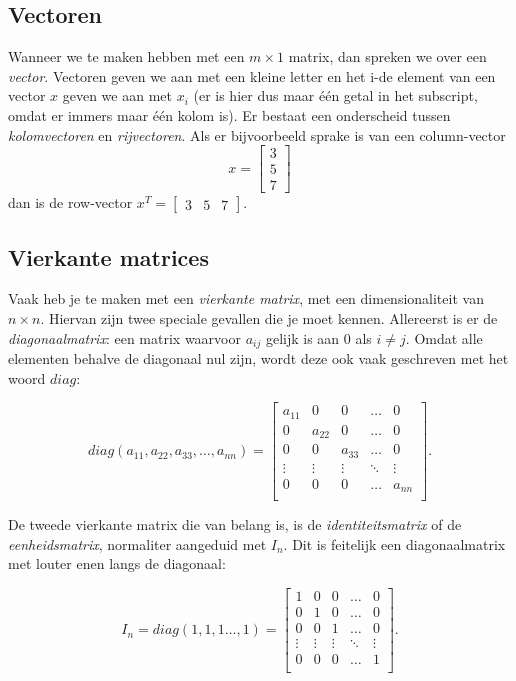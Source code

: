 \subsection{Vectoren}
Wanneer we te maken hebben met een $m \times 1$ matrix, dan spreken we over een \textit{vector}. Vectoren geven we aan met een kleine letter en het i-de element van een vector $x$ geven we aan met $x_i$ (er is hier dus maar één getal in het subscript, omdat er immers maar één kolom is). Er bestaat een onderscheid tussen \textit{kolomvectoren} en \textit{rijvectoren}. Als er bijvoorbeeld sprake is van een column-vector
%
\[ 
x = \begin{bmatrix} 
3\\
5\\
7
\end{bmatrix}
\] 
%
dan is de row-vector $x^T = \begin{bmatrix}3 & 5 & 7\end{bmatrix}$.

\subsection{Vierkante matrices}
Vaak heb je te maken met een \textit{vierkante matrix}, met een dimensionaliteit van $n \times n$. Hiervan zijn twee speciale gevallen die je moet kennen. Allereerst is er de \textit{diagonaalmatrix}: een matrix waarvoor $a_{ij}$ gelijk is aan $0$ als $i \neq j$. Omdat alle elementen behalve de diagonaal nul zijn, wordt deze ook vaak geschreven met het woord $diag$:

\[
diag(a_{11}, a_{22}, a_{33}, \hdots, a_{nn}) =
\begin{bmatrix}
a_{11} & 0 & 0 & \hdots & 0 \\
0 & a_{22} & 0 & \hdots & 0 \\
0 & 0 & a_{33} & \hdots & 0 \\
\vdots & \vdots &\vdots & \ddots & \vdots \\
0 & 0 & 0 & \hdots & a_{nn} \\
\end{bmatrix}.
\]

De tweede vierkante matrix die van belang is, is de \textit{identiteitsmatrix} of de \textit{eenheidsmatrix}, normaliter aangeduid met $I_n$. Dit is feitelijk een diagonaalmatrix met louter enen langs de diagonaal:

\[
I_n = diag(1, 1, 1 \hdots, 1) = 
\begin{bmatrix}
1 & 0 & 0 & \hdots & 0 \\
0 & 1 & 0 & \hdots & 0 \\
0 & 0 & 1 & \hdots & 0 \\
\vdots & \vdots &\vdots & \ddots & \vdots \\
0 & 0 & 0 & \hdots & 1 \\
\end{bmatrix}.
\]

